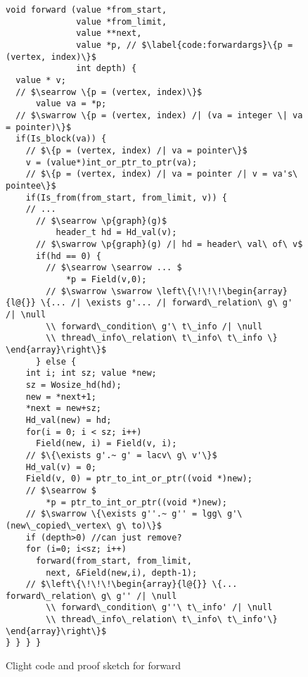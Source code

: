 
\begin{figure}[t]
\vspace{-1ex}
  \begin{lstlisting}
void forward (value *from_start,
              value *from_limit,  
              value **next,       
              value *p, // $\label{code:forwardargs}\{p = (vertex, index)\}$
              int depth) {
  value * v;
  // $\searrow \{p = (vertex, index)\}$
      value va = *p; 
  // $\swarrow \{p = (vertex, index) /| (va = integer \| va = pointer)\}$ 
  if(Is_block(va)) {
    // $\{p = (vertex, index) /| va = pointer\}$ 
    v = (value*)int_or_ptr_to_ptr(va);
    // $\{p = (vertex, index) /| va = pointer /| v = va's\ pointee\}$ 
    if(Is_from(from_start, from_limit, v)) {
    // ...  
      // $\searrow \p{graph}(g)$
          header_t hd = Hd_val(v);
      // $\swarrow \p{graph}(g) /| hd = header\ val\ of\ v$
      if(hd == 0) {
        // $\searrow \searrow ... $
            *p = Field(v,0);
        // $\swarrow \swarrow \left\{\!\!\!\begin{array}{l@{}} \{... /| \exists g'... /| forward\_relation\ g\ g' /| \null 
        \\ forward\_condition\ g'\ t\_info /| \null 
        \\ thread\_info\_relation\ t\_info\ t\_info \} \end{array}\right\}$
      } else {
    int i; int sz; value *new;
    sz = Wosize_hd(hd);
    new = *next+1;
    *next = new+sz;
    Hd_val(new) = hd;
    for(i = 0; i < sz; i++)
      Field(new, i) = Field(v, i); 
    // $\{\exists g'.~ g' = lacv\ g\ v'\}$   
    Hd_val(v) = 0;
    Field(v, 0) = ptr_to_int_or_ptr((void *)new);
    // $\searrow $
        *p = ptr_to_int_or_ptr((void *)new);
    // $\swarrow \{\exists g''.~ g'' = lgg\ g'\ (new\_copied\_vertex\ g\ to)\}$
    if (depth>0) //can just remove?
    for (i=0; i<sz; i++)
      forward(from_start, from_limit, 
        next, &Field(new,i), depth-1);
    // $\left\{\!\!\!\begin{array}{l@{}} \{... forward\_relation\ g\ g'' /| \null 
        \\ forward\_condition\ g''\ t\_info' /| \null 
        \\ thread\_info\_relation\ t\_info\ t\_info'\} \end{array}\right\}$
} } } }
\end{lstlisting}

\vspace{-0.4em}
\caption{Clight code and proof sketch for forward}
\label{fig:forward}
\vspace{-1em}
\end{figure}
